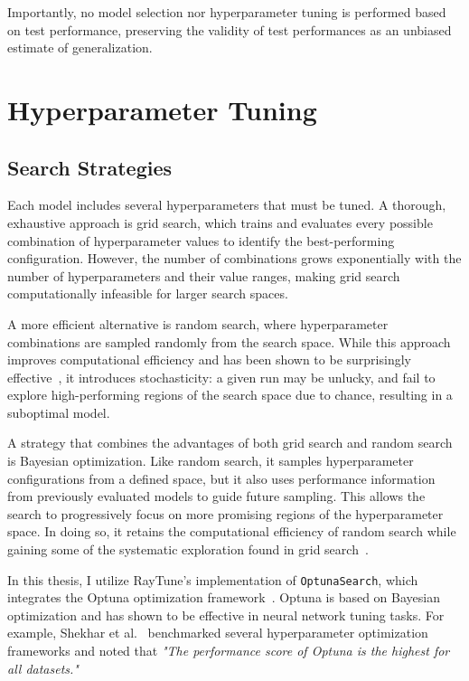 Importantly, no model selection nor hyperparameter tuning is performed based on test performance, preserving the validity of test performances as an unbiased estimate of generalization.

\section{Hyperparameter Tuning}\label{HyperparameterTuning}

\subsection{Search Strategies}

Each model includes several hyperparameters that must be tuned. A thorough, exhaustive approach is grid search, which trains and evaluates every possible combination of hyperparameter values to identify the best-performing configuration. However, the number of combinations grows exponentially with the number of hyperparameters and their value ranges, making grid search computationally infeasible for larger search spaces. 

A more efficient alternative is random search, where hyperparameter combinations are sampled randomly from the search space. While this approach improves computational efficiency and has been shown to be surprisingly effective~\cite{bergstra2012random}, it introduces stochasticity: a given run may be unlucky, and fail to explore high-performing regions of the search space due to chance, resulting in a suboptimal model.

A strategy that combines the advantages of both grid search and random search is Bayesian optimization. Like random search, it samples hyperparameter configurations from a defined space, but it also uses performance information from previously evaluated models to guide future sampling. This allows the search to progressively focus on more promising regions of the hyperparameter space. In doing so, it retains the computational efficiency of random search while gaining some of the systematic exploration found in grid search~\cite{snoek2012practical}.

In this thesis, I utilize RayTune's implementation of \texttt{OptunaSearch}, which integrates the Optuna optimization framework~\cite{akiba2019optuna}. Optuna is based on Bayesian optimization and has shown to be effective in neural network tuning tasks. For example, Shekhar et al.~\cite{shekhar2021comparative} benchmarked several hyperparameter optimization frameworks and noted that \textit{"The performance score of Optuna is the highest for all datasets."}

